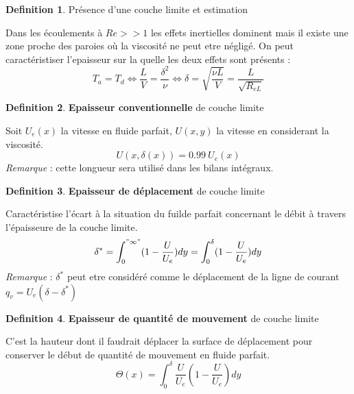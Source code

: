 \documentclass[french]{article}
\theoremstyle{definition}
\newtheorem{definition}{Definition}[section]
\begin{document}
\begin{definition} Présence d'une couche limite et estimation \par
	Dans les écoulements à $Re >> 1$ les effets inertielles dominent mais il existe une zone proche des paroies où la viscosité ne peut etre négligé. On peut caractéristiser l'epaisseur sur la quelle les deux effets sont présents :
	$$ T_a = T_d \Leftrightarrow \frac{L}{V} = \frac{\delta^2}{\nu} \Leftrightarrow \delta = \sqrt{\frac{\nu L}{V}} = \frac{L}{\sqrt{R_{eL}}} $$
\end{definition}

\begin{definition} \textbf{Epaisseur conventionnelle} de couche limite \par
	Soit $ U_e(x) $ la vitesse en fluide parfait, $U(x,y)$ la vitesse en considerant la viscosité.
	$$ U(x,\delta(x)) = 0.99 \ U_e(x) $$
	\textit{Remarque} : cette longueur sera utilisé dans les bilans intégraux.
\end{definition}

\begin{definition} \textbf{Epaisseur de déplacement} de couche limite \par
	Caractéristise l'écart à la situation du fuilde parfait concernant le débit à travers l'épaisseure de la couche limite.
	$$ \delta ^{*} = \int_0^{"\infty"} (1 - \frac{U}{U_e}) dy = \int_0^{\delta} (1 - \frac{U}{U_e}) dy$$
	\textit{Remarque} : $\delta^{*}$ peut etre considéré comme le déplacement de la ligne de courant $q_v = U_e(\delta-\delta^{*})$
\end{definition}

\begin{definition} \textbf{Epaisseur de quantité de mouvement} de couche limite \par
	C'est la hauteur dont il faudrait déplacer la surface de déplacement pour conserver le début de quantité de mouvement en fluide parfait.
	$$ \Theta(x) = \int_0^{\delta} \frac{U}{U_e} (1-\frac{U}{U_e}) dy $$
\end{definition}
\end{document}
